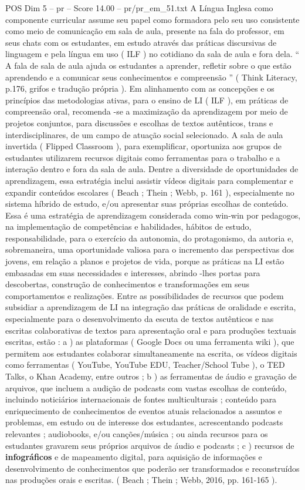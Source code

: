 \begin{textsample}{POS Dim 5 – pr – Score 14.00 – pr/pr\_em\_51.txt}  \label{ex:f5_pos_053}
A Língua Inglesa como componente curricular assume seu papel como formadora pelo seu uso consistente como meio de comunicação em sala de aula, presente na fala do professor, em seus chats com os estudantes, em estudo através das práticas discursivas de linguagem e pela língua em uso ( ILF ) no cotidiano da sala de aula e fora dela. “ A fala de sala de aula ajuda os estudantes a aprender, refletir sobre o que estão aprendendo e a comunicar seus conhecimentos e compreensão ” ( Think Literacy, p.176, grifos e tradução própria ).
Em alinhamento com as concepções e os princípios das metodologias ativas, para o ensino de LI ( ILF ), em práticas de compreensão oral, recomenda -se a maximização da aprendizagem por meio de projetos conjuntos, para discussões e escolhas de textos autênticos, trans e interdisciplinares, de um campo de atuação social selecionado.
A sala de aula invertida ( Flipped Classroom ), para exemplificar, oportuniza aos grupos de estudantes utilizarem recursos digitais como ferramentas para o trabalho e a interação dentro e fora da sala de aula.
Dentre a diversidade de oportunidades de aprendizagem, essa estratégia inclui assistir vídeos digitais para complementar e expandir conteúdos escolares ( Beach ; Thein ; Webb, p. 161 ), especialmente no sistema híbrido de estudo, e/ou apresentar suas próprias escolhas de conteúdo.
Essa é uma estratégia de aprendizagem considerada como win-win por pedagogos, na implementação de competências e habilidades, hábitos de estudo, responsabilidade, para o exercício da autonomia, do protagonismo, da autoria e, sobremaneira, uma oportunidade valiosa para o incremento das perspectivas dos jovens, em relação a planos e projetos de vida, porque as práticas na LI estão embasadas em suas necessidades e interesses, abrindo -lhes portas para descobertas, construção de conhecimentos e transformações em seus comportamentos e realizações.
Entre as possibilidades de recursos que podem subsidiar a aprendizagem de LI na integração das práticas de oralidade e escrita, especialmente para o desenvolvimento da escuta de textos autênticos e nas escritas colaborativas de textos para apresentação oral e para produções textuais escritas, estão : a ) as plataformas ( Google Docs ou uma ferramenta wiki ), que permitem aos estudantes colaborar simultaneamente na escrita, os vídeos digitais como ferramentas ( YouTube, YouTube EDU, Teacher/School Tube ), o TED Talks, o Khan Academy, entre outros ; b ) as ferramentas de áudio e gravação de arquivos, que incluem a audição de podcasts com vastas escolhas de conteúdo, incluindo noticiários internacionais de fontes multiculturais ; conteúdo para enriquecimento de conhecimentos de eventos atuais relacionados a assuntos e problemas, em estudo ou de interesse dos estudantes, acrescentando podcasts relevantes ; audiobooks, e/ou canções/música ; ou ainda recursos para os estudantes gravarem seus próprios arquivos de áudio e podcasts ; c ) recursos de \textbf{infográficos} e de mapeamento digital, para aquisição de informações e desenvolvimento de conhecimentos que poderão ser transformados e reconstruídos nas produções orais e escritas. ( Beach ; Thein ; Webb, 2016, pp. 161-165 ).

\end{textsample}
